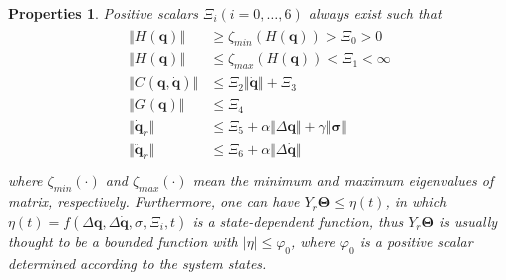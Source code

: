 \documentclass[3p]{elsarticle}
\theoremstyle{plain}
\newtheorem{mypro}{Properties}
\theoremstyle{remark}
\begin{document}
\begin{mypro}\cite{parra2003dynamic}\label{pro:1}
Positive scalars $\Xi_i(i = 0,\ldots,6)$ always exist such that
\begin{align}
\begin{split}
\Vert H(\bm q)\Vert & \ge \zeta_{min}(H(\bm q))>\Xi_0>0\\
\Vert H(\bm q)\Vert & \le \zeta_{max}(H(\bm q))<\Xi_1<\infty\\
\Vert C(\bm q,\dot {\bm q})\Vert & \le \Xi_2\Vert\dot {\bm q}\Vert+\Xi_3\\
\Vert G(\bm q)\Vert & \le \Xi_4\\
\Vert \dot {\bm q}_r\Vert & \le \Xi_5+\alpha\Vert\Delta \bm q\Vert+\gamma\Vert\bm\sigma\Vert\\
\Vert \ddot {\bm q}_r\Vert & \le \Xi_6+\alpha\Vert\Delta \dot {\bm q}\Vert\\
\end{split}
\end{align}
where $\zeta_{min}(\cdot)$ and $\zeta_{max}(\cdot)$ mean the minimum and maximum eigenvalues of matrix, respectively. Furthermore, one can have $Y_r\bm\Theta\le \eta(t)$, in which $\eta(t)=f(\Delta \bm q,\Delta \dot {\bm q},\sigma,\Xi_i,t)$ is a state-dependent function, thus $Y_r\bm\Theta$ is usually thought to be a bounded function with $\vert\eta\vert\le\varphi_0$, where $\varphi_0$ is a positive scalar determined according to the system states.
\end{mypro}
\end{document}
